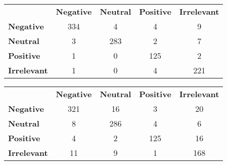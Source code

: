 \documentclass[10pt]{amsart}
\theoremstyle{definition}
\begin{document}
%

\begin{tabular}{lcccc}
  {} & {\bf Negative} & {\bf Neutral} & {\bf Positive} & {\bf Irrelevant}\\
  {\bf Negative}   & {334} & {4} & {4} & {9}\\
  {\bf Neutral}    & {3} & {283} & {2} & {7}\\
  {\bf Positive}   & {1} & {0} & {125} & {2}\\
  {\bf Irrelevant} & {1} & {0} & {4} & {221}\\
\end{tabular}





\begin{tabular}{lcccc}
  {} & {\bf Negative} & {\bf Neutral} & {\bf Positive} & {\bf Irrelevant}\\
  {\bf Negative}   & {321} & {16} & {3} & {20}\\
  {\bf Neutral}    & {8} & {286} & {4} & {6}\\
  {\bf Positive}   & {4} & {2} & {125} & {16}\\
  {\bf Irrelevant} & {11} & {9} & {1} & {168}\\
\end{tabular}
\end{document}
